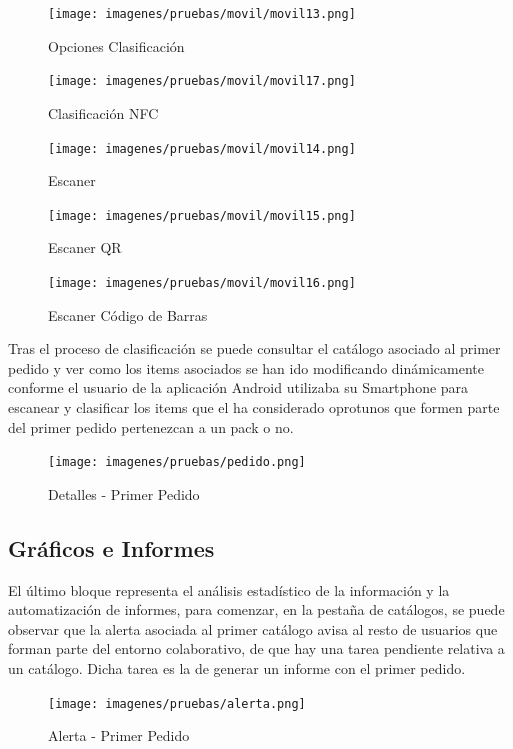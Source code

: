 \documentclass[a4paper,11pt]{book}
\begin{document}
\begin{figure}[H]
  \texttt{[image: imagenes/pruebas/movil/movil13.png]}
  \caption{Opciones Clasificación\cite{propio}}
\endminipage\hfill
{}
  \texttt{[image: imagenes/pruebas/movil/movil17.png]}
  \caption{Clasificación NFC\cite{propio}}
\endminipage\hfill
\end{figure}

\begin{figure}[H]
  \texttt{[image: imagenes/pruebas/movil/movil14.png]}
  \caption{Escaner\cite{propio}}
\endminipage\hfill
{}
  \texttt{[image: imagenes/pruebas/movil/movil15.png]}
  \caption{Escaner QR\cite{propio}}
\endminipage\hfill
{}
  \texttt{[image: imagenes/pruebas/movil/movil16.png]}
  \caption{Escaner Código de Barras\cite{propio}}
\endminipage\hfill
\end{figure}

Tras el proceso de clasificación se puede consultar el catálogo asociado al primer pedido y ver como los items asociados se han ido modificando dinámicamente conforme el usuario de la aplicación Android utilizaba su Smartphone para escanear y clasificar los items que el ha considerado oprotunos que formen parte del primer pedido pertenezcan a un pack o no. 

\begin{figure}[H] 
\centering 
\texttt{[image: imagenes/pruebas/pedido.png]}
\caption{ Detalles - Primer Pedido\cite{propio}}
\end{figure}

\subsection{ Gráficos e Informes}

El último bloque representa el análisis estadístico de la información y la automatización de informes, para comenzar, en la pestaña de catálogos, se puede observar que la alerta asociada al primer catálogo avisa al resto de usuarios que forman parte del entorno colaborativo, de que hay una tarea pendiente relativa a un catálogo. Dicha tarea es la de generar un informe con el primer pedido.

\begin{figure}[H] 
\centering 
\texttt{[image: imagenes/pruebas/alerta.png]}
\caption{ Alerta - Primer Pedido\cite{propio}}
\end{figure}
\end{document}
